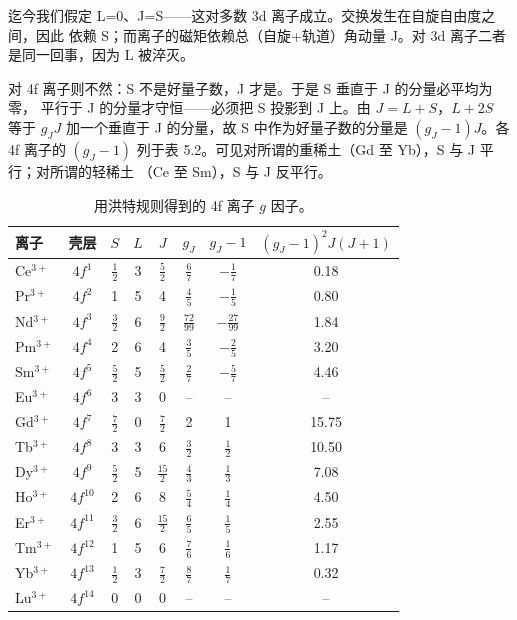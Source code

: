 迄今我们假定 L=0、J=S——这对多数 3d 离子成立。交换发生在自旋自由度之间，因此
依赖 S；而离子的磁矩依赖总（自旋+轨道）角动量 J。对 3d 离子二者是同一回事，因为
L 被淬灭。

对 4f 离子则不然：S 不是好量子数，J 才是。于是 S 垂直于 J 的分量必平均为零，
平行于 J 的分量才守恒——必须把 S 投影到 J 上。由 $J=L+S$，$L+2S$ 等于 $g_JJ$
加一个垂直于 J 的分量，故 S 中作为好量子数的分量是 $(g_J-1)J$。各 4f 离子的
$(g_J-1)$ 列于表 5.2。可见对所谓的重稀土（Gd 至 Yb），S 与 J 平行；对所谓的轻稀土
（Ce 至 Sm），S 与 J 反平行。

\begin{table}
\centering
\caption{用洪特规则得到的 4f 离子 $g$ 因子。}
\begin{small}
\begin{tabular}{lccccccc}
\toprule
离子 & 壳层 & $S$ & $L$ & $J$ & $g_J$ & $g_J-1$ & $(g_J-1)^{2}J(J+1)$\\
\midrule
Ce$^{3+}$ & $4f^{1}$ & $\frac{1}{2}$ & 3 & $\frac{5}{2}$ & $\frac{6}{7}$ & $-\frac{1}{7}$ & 0.18\\
Pr$^{3+}$ & $4f^{2}$ & 1 & 5 & 4 & $\frac{4}{5}$ & $-\frac{1}{5}$ & 0.80\\
Nd$^{3+}$ & $4f^{3}$ & $\frac{3}{2}$ & 6 & $\frac{9}{2}$ & $\frac{72}{99}$ & $-\frac{27}{99}$ & 1.84\\
Pm$^{3+}$ & $4f^{4}$ & 2 & 6 & 4 & $\frac{3}{5}$ & $-\frac{2}{5}$ & 3.20\\
Sm$^{3+}$ & $4f^{5}$ & $\frac{5}{2}$ & 5 & $\frac{5}{2}$ & $\frac{2}{7}$ & $-\frac{5}{7}$ & 4.46\\
Eu$^{3+}$ & $4f^{6}$ & 3 & 3 & 0 & -- & -- & --\\
Gd$^{3+}$ & $4f^{7}$ & $\frac{7}{2}$ & 0 & $\frac{7}{2}$ & 2 & 1 & 15.75\\
Tb$^{3+}$ & $4f^{8}$ & 3 & 3 & 6 & $\frac{3}{2}$ & $\frac{1}{2}$ & 10.50\\
Dy$^{3+}$ & $4f^{9}$ & $\frac{5}{2}$ & 5 & $\frac{15}{2}$ & $\frac{4}{3}$ & $\frac{1}{3}$ & 7.08\\
Ho$^{3+}$ & $4f^{10}$ & 2 & 6 & 8 & $\frac{5}{4}$ & $\frac{1}{4}$ & 4.50\\
Er$^{3+}$ & $4f^{11}$ & $\frac{3}{2}$ & 6 & $\frac{15}{2}$ & $\frac{6}{5}$ & $\frac{1}{5}$ & 2.55\\
Tm$^{3+}$ & $4f^{12}$ & 1 & 5 & 6 & $\frac{7}{6}$ & $\frac{1}{6}$ & 1.17\\
Yb$^{3+}$ & $4f^{13}$ & $\frac{1}{2}$ & 3 & $\frac{7}{2}$ & $\frac{8}{7}$ & $\frac{1}{7}$ & 0.32\\
Lu$^{3+}$ & $4f^{14}$ & 0 & 0 & 0 & -- & -- & --\\
\bottomrule
\end{tabular}
\end{small}
\end{table}

